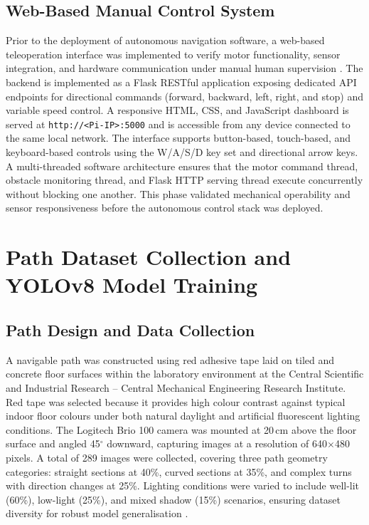 \subsection{Web-Based Manual Control System}

Prior to the deployment of autonomous navigation software, a
web-based teleoperation interface was implemented to verify motor
functionality, sensor integration, and hardware communication under
manual human supervision \cite{r2}. The backend is implemented as a
Flask RESTful application \cite{r37} exposing dedicated API endpoints
for directional commands (forward, backward, left, right, and stop)
and variable speed control. A responsive HTML, CSS, and JavaScript
dashboard is served at \texttt{http://<Pi-IP>:5000} and is accessible
from any device connected to the same local network. The interface
supports button-based, touch-based, and keyboard-based controls using
the W/A/S/D key set and directional arrow keys. A multi-threaded
software architecture ensures that the motor command thread, obstacle
monitoring thread, and Flask HTTP serving thread execute concurrently
without blocking one another. This phase validated mechanical
operability and sensor responsiveness before the autonomous control
stack was deployed.

\section{Path Dataset Collection and YOLOv8 Model Training}

\subsection{Path Design and Data Collection}

A navigable path was constructed using red adhesive tape laid
on tiled and concrete floor surfaces within the laboratory environment
at the Central Scientific and Industrial Research -- Central Mechanical
Engineering Research Institute. Red tape was selected because it provides
high colour contrast against typical indoor floor colours under both
natural daylight and artificial fluorescent lighting conditions. The
Logitech Brio 100 camera was mounted at 20\,cm above the floor surface
and angled 45$^\circ$ downward, capturing images at a resolution of
640$\times$480 pixels. A total of 289 images were collected, covering
three path geometry categories: straight sections at 40\%, curved
sections at 35\%, and complex turns with direction changes at 25\%.
Lighting conditions were varied to include well-lit (60\%), low-light
(25\%), and mixed shadow (15\%) scenarios, ensuring dataset diversity
for robust model generalisation \cite{r32,r31}.

